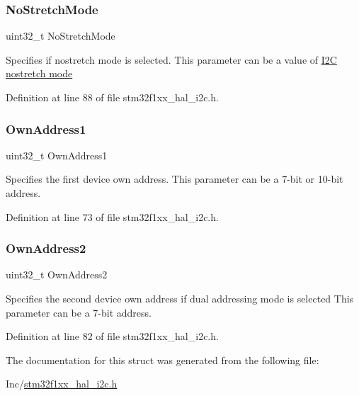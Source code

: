 \subsubsection{\texorpdfstring{No\+Stretch\+Mode}{NoStretchMode}}
{\footnotesize\ttfamily uint32\+\_\+t No\+Stretch\+Mode}

Specifies if nostretch mode is selected. This parameter can be a value of \hyperlink{group___i2_c__nostretch__mode}{I2C nostretch mode} 

Definition at line 88 of file stm32f1xx\+\_\+hal\+\_\+i2c.\+h.

\mbox{\label{struct_i2_c___init_type_def_a8abec5c168e27bf11b2808c1450bdeda}} 
\subsubsection{\texorpdfstring{Own\+Address1}{OwnAddress1}}
{\footnotesize\ttfamily uint32\+\_\+t Own\+Address1}

Specifies the first device own address. This parameter can be a 7-\/bit or 10-\/bit address. 

Definition at line 73 of file stm32f1xx\+\_\+hal\+\_\+i2c.\+h.

\mbox{\label{struct_i2_c___init_type_def_a6300c7a7e1b7d5444226a1bd55744f53}} 
\subsubsection{\texorpdfstring{Own\+Address2}{OwnAddress2}}
{\footnotesize\ttfamily uint32\+\_\+t Own\+Address2}

Specifies the second device own address if dual addressing mode is selected This parameter can be a 7-\/bit address. 

Definition at line 82 of file stm32f1xx\+\_\+hal\+\_\+i2c.\+h.



The documentation for this struct was generated from the following file\+:\begin{DoxyCompactItemize}
\item 
Inc/\hyperlink{stm32f1xx__hal__i2c_8h}{stm32f1xx\+\_\+hal\+\_\+i2c.\+h}\end{DoxyCompactItemize}
